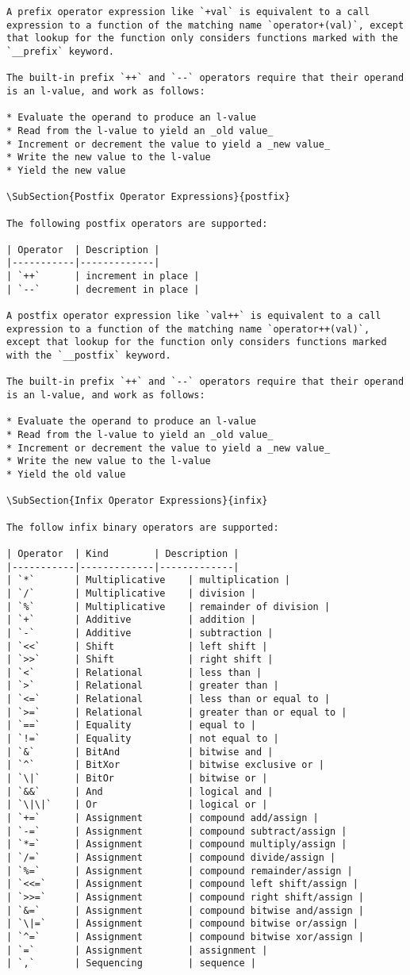 \begin{verbatim}
A prefix operator expression like `+val` is equivalent to a call expression to a function of the matching name `operator+(val)`, except that lookup for the function only considers functions marked with the `__prefix` keyword.

The built-in prefix `++` and `--` operators require that their operand is an l-value, and work as follows:

* Evaluate the operand to produce an l-value
* Read from the l-value to yield an _old value_
* Increment or decrement the value to yield a _new value_
* Write the new value to the l-value
* Yield the new value

\SubSection{Postfix Operator Expressions}{postfix}

The following postfix operators are supported:

| Operator 	| Description |
|-----------|-------------|
| `++`		| increment in place |
| `--`		| decrement in place |

A postfix operator expression like `val++` is equivalent to a call expression to a function of the matching name `operator++(val)`, except that lookup for the function only considers functions marked with the `__postfix` keyword.

The built-in prefix `++` and `--` operators require that their operand is an l-value, and work as follows:

* Evaluate the operand to produce an l-value
* Read from the l-value to yield an _old value_
* Increment or decrement the value to yield a _new value_
* Write the new value to the l-value
* Yield the old value

\SubSection{Infix Operator Expressions}{infix}

The follow infix binary operators are supported:

| Operator 	| Kind        | Description |
|-----------|-------------|-------------|
| `*`		| Multiplicative 	| multiplication |
| `/`		| Multiplicative 	| division |
| `%`		| Multiplicative 	| remainder of division |
| `+`		| Additive 			| addition |
| `-`		| Additive 			| subtraction |
| `<<`		| Shift 			| left shift |
| `>>`		| Shift 			| right shift |
| `<` 		| Relational 		| less than |
| `>`		| Relational 		| greater than |
| `<=`		| Relational 		| less than or equal to |
| `>=`		| Relational 		| greater than or equal to |
| `==`		| Equality 			| equal to |
| `!=`		| Equality 			| not equal to |
| `&`		| BitAnd 			| bitwise and |
| `^`		| BitXor			| bitwise exclusive or |
| `\|`		| BitOr 			| bitwise or |
| `&&`		| And 				| logical and |
| `\|\|`	| Or 				| logical or |
| `+=`		| Assignment  		| compound add/assign |
| `-=`      | Assignment  		| compound subtract/assign |
| `*=`      | Assignment  		| compound multiply/assign |
| `/=`      | Assignment  		| compound divide/assign |
| `%=`      | Assignment  		| compound remainder/assign |
| `<<=`     | Assignment  		| compound left shift/assign |
| `>>=`     | Assignment  		| compound right shift/assign |
| `&=`      | Assignment  		| compound bitwise and/assign |
| `\|=`     | Assignment  		| compound bitwise or/assign |
| `^=`      | Assignment  		| compound bitwise xor/assign |
| `=`       | Assignment  		| assignment |
| `,`		| Sequencing  		| sequence |


\end{verbatim}
